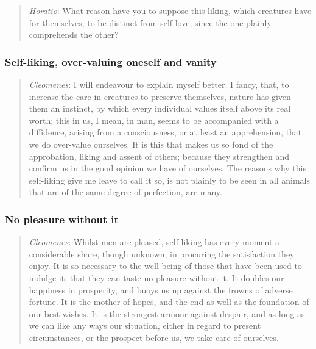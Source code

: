             \begin{quote}
                \textit{Horatio}: What reason have you to suppose this liking, which creatures have for themselves, to be distinct from self-love; since the one plainly comprehends the other?
            \end{quote}

        \subsubsection{Self-liking, over-valuing oneself and vanity}

            \begin{quote}
                \textit{Cleomenes}: I will endeavour to explain myself better. I fancy, that, to increase the care in creatures to preserve themselves, nature has given them an instinct, by which every individual values itself above its real worth; this in us, I mean, in man, seems to be accompanied with a diffidence, arising from a consciousness, or at least an apprehension, that we do over-value ourselves. It is this that makes us so fond of the approbation, liking and assent of others; because they strengthen and confirm us in the good opinion we have of ourselves. The reasons why this self-liking give me leave to call it so, is not plainly to be seen in all animals that are of the same degree of perfection, are many.
            \end{quote}

        \subsubsection{No pleasure without it}

            \begin{quote}
                \textit{Cleomenes}: Whilst men are pleased, self-liking has every moment a considerable share, though unknown, in procuring the satisfaction they enjoy. It is so necessary to the well-being of those that have been used to indulge it; that they can taste no pleasure without it. It doubles our happiness in prosperity, and buoys us up against the frowns of adverse fortune. It is the mother of hopes, and the end as well as the foundation of our best wishes. It is the strongest armour against despair, and as long as we can like any ways our situation, either in regard to present circumstances, or the prospect before us, we take care of ourselves.
            \end{quote}

